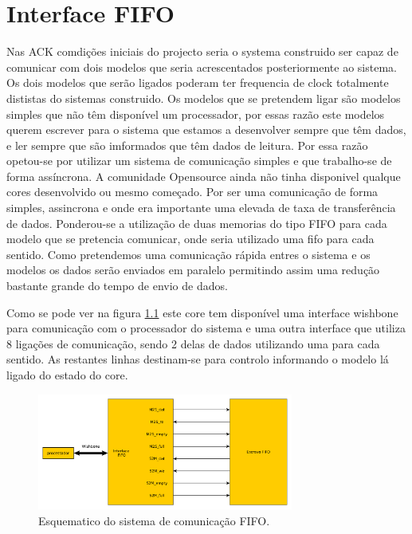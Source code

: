 
\chapter{Interface FIFO}
\label{chapter:Iter_FIFO}

Nas \ac{ACK} comdições iniciais do projecto seria o systema construido ser capaz de comunicar com dois modelos que seria acrescentados posteriormente ao sistema. Os dois modelos que serão ligados poderam ter frequencia de clock totalmente dististas do sistemas construido. Os modelos que se pretendem ligar são modelos simples que não têm disponível um processador, por essas razão este modelos querem escrever para o sistema que estamos a desenvolver sempre que têm dados, e ler sempre que são imformados que têm dados de leitura.   Por essa razão opetou-se por utilizar um sistema de comunicação simples e que trabalho-se de forma assíncrona. A comunidade Opensource ainda não tinha disponivel qualque cores desenvolvido ou mesmo começado. Por ser uma comunicação de forma simples, assincrona e onde era importante uma elevada de taxa de transferência de dados. Ponderou-se a utilização de duas memorias do tipo FIFO para cada modelo que se pretencia comunicar, onde seria utilizado uma fifo para cada sentido. Como pretendemos uma comunicação rápida entres o sistema e os modelos os dados serão enviados em paralelo permitindo assim uma redução bastante grande do tempo de envio de dados.

Como se pode ver na figura \ref{fig:ligacoesFIFO} este core tem disponível uma interface wishbone para comunicação com o processador do sistema e uma outra interface que utiliza 8 ligações de comunicação, sendo 2 delas de dados utilizando uma para cada sentido. As restantes linhas destinam-se para controlo informando o modelo lá ligado do estado do core. 

\begin{figure}[!htb]
  \centering
  \includegraphics[width=0.75\textwidth]{grafos/FIFO.pdf} %
  \caption[Protocolo FIFO]{Esquematico do sistema de comunicação FIFO.}
  \label{fig:ligacoesFIFO}
\end{figure}

